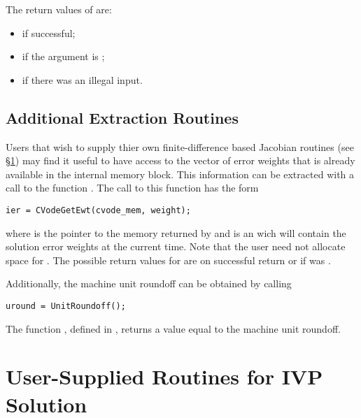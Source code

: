 \begin{itemize}
  The return values of  are:
  \begin{itemize}
  \item {} if successful;
  \item {} if the  argument is ;
  \item {} if there was an illegal input.
  \end{itemize}         

\end{itemize}

\subsection{Additional Extraction Routines}\label{sss:cvodegetewt}

Users that wish to supply thier own finite-difference based Jacobian routines
(see \S\ref{ss:user_fct_sim}) may find it useful to have access to the
vector of error weights that is already available in the {\cvodes} internal 
memory block. This information can be extracted with a call to the function
.
The call to this function has the form
\begin{verbatim}
ier = CVodeGetEwt(cvode_mem, weight);
\end{verbatim}
where  is the pointer to the {\cvodes} memory returned by
 and  is an {\nvector} wich will contain
the solution error weights at the current time. Note that the user need not
allocate space for . The possible return
values for  are  on successful return or 
if  was .

Additionally, the machine unit roundoff can be obtained by calling
\begin{verbatim}
uround = UnitRoundoff();
\end{verbatim}
The function , defined in , returns a
 value equal to the machine unit roundoff.

\section{User-Supplied Routines for IVP Solution}\label{ss:user_fct_sim}


